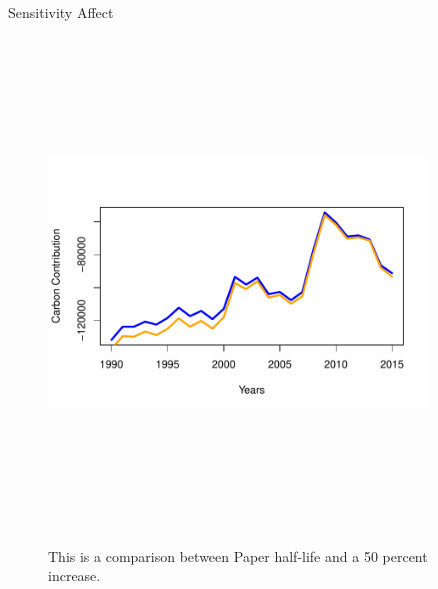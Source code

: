 \documentclass[final]{beamer}\usepackage[]{graphicx}\usepackage[]{color}
\newlength{\sepwid}
\newlength{\onecolwid}
\newlength{\twocolwid}
\begin{document}
\begin{frame}[t]
\begin{columns}[t]
\begin{column}{\twocolwid}
\begin{columns}[t,totalwidth=\twocolwid]
\begin{column}{\onecolwid}
\begin{block}{Sensitivity Affect}
\begin{center}
\begin{figure}
    {\includegraphics[width=1\linewidth, height = 13cm]{CopyOfTSPlot.pdf}}
    \caption{This is a comparison between Paper half-life and a 50 percent increase.}
\end{figure}
\end{center}
\end{block}


\end{column} %

\end{columns} %

\end{column} %

\begin{column}{\sepwid}\end{column} %

\begin{column}{\onecolwid} %



\end{column}
\end{columns}
\end{frame}
\end{document}
